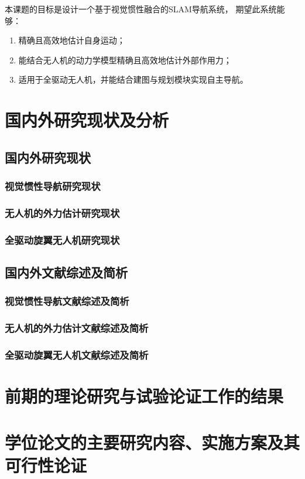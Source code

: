 本课题的目标是设计一个基于视觉惯性融合的SLAM导航系统，
期望此系统能够：
\begin{enumerate}
    \item 精确且高效地估计自身运动；
    \item 能结合无人机的动力学模型精确且高效地估计外部作用力；
    \item 适用于全驱动无人机，并能结合建图与规划模块实现自主导航。
\end{enumerate}

\section{国内外研究现状及分析}
\subsection{国内外研究现状}
\subsubsection{视觉惯性导航研究现状}
\subsubsection{无人机的外力估计研究现状}
\subsubsection{全驱动旋翼无人机研究现状}
\subsection{国内外文献综述及简析}
\subsubsection{视觉惯性导航文献综述及简析}
\subsubsection{无人机的外力估计文献综述及简析}
\subsubsection{全驱动旋翼无人机文献综述及简析}
\section{前期的理论研究与试验论证工作的结果}
\section{学位论文的主要研究内容、实施方案及其可行性论证}
